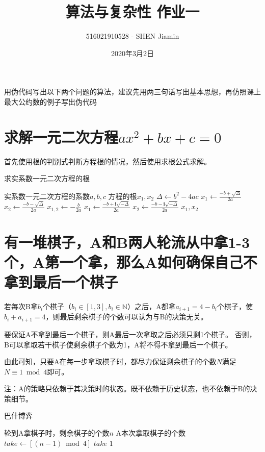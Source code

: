 \documentclass{article}
\title{算法与复杂性 \quad 作业一}
\author{516021910528 - SHEN Jiamin}
\date{2020年3月2日}
\begin{document}
\maketitle

用伪代码写出以下两个问题的算法，建议先用两三句话写出基本思想，再仿照课上最大公约数的例子写出伪代码

\section{求解一元二次方程$ax^2+bx+c=0$}

首先使用根的判别式判断方程根的情况，然后使用求根公式求解。

\begin{algorithm}
    \caption{求实系数一元二次方程的根}\label{QuadraticEquation}
    \begin{algorithmic}[1]
        \Require 实系数一元二次方程的系数$a,b,c$
        \Ensure 方程的根$x_1,x_2$
        \State $\Delta \gets b^2-4ac$ 
         
        \State $x_1 \gets \frac{-b + \sqrt{\Delta}}{2a}$
        \State $x_2 \gets \frac{-b - \sqrt{\Delta}}{2a}$
         
        \State $x_{1,2} \gets -\frac{b}{2a}$
         
        \State $x_1 \gets \frac{-b + \bm{i}\sqrt{-\Delta}}{2a}$
        \State $x_2 \gets \frac{-b - \bm{i}\sqrt{-\Delta}}{2a}$
        \EndIf
        \State \Return $x_1, x_2$
    \end{algorithmic}
\end{algorithm}

\newpage

\section{有一堆棋子，A和B两人轮流从中拿1-3个，A第一个拿，那么A如何确保自己不拿到最后一个棋子}

若每次B拿$b_i$个棋子（$b_i \in [1,3], b_i \in \mathbb{N}$）之后，A都拿$a_{i+1} = 4 - b_{i}$个棋子，使$b_i + a_{i+1} = 4$，则最后剩余棋子的个数可以认为与B的决策无关。

要保证A不拿到最后一个棋子，则A最后一次拿取之后必须只剩1个棋子。
否则，B可以拿取若干棋子使剩余棋子个数为1，A将不得不拿到最后一个棋子。

由此可知，只要A在每一步拿取棋子时，都尽力保证剩余棋子的个数$N$满足$N \equiv 1 \bmod 4$即可。

注：A的策略只依赖于其决策时的状态。既不依赖于历史状态，也不依赖于B的决策细节。

\begin{algorithm}
    \caption{巴什博弈}\label{VariedBashGame}
    \begin{algorithmic}[1]
        \Require 轮到A拿棋子时，剩余棋子的个数$n$
        \Ensure A本次拿取棋子的个数
        \State $take \gets [(n-1) \bmod 4]$
        \State \Return $take$ 
        \Else
        \State \Return $1$ 
        \EndIf
    \end{algorithmic}
\end{algorithm}
\end{document}
